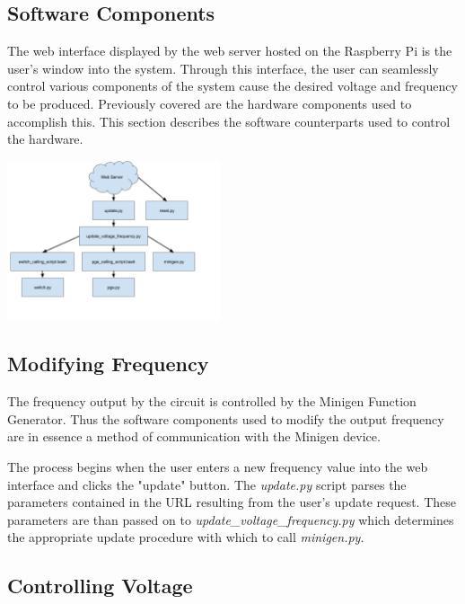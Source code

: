 \documentclass{article}	%
\begin{document}
\begin{multicols}{2}
\section{Software Components}
The web interface displayed by
the web server hosted on the Raspberry Pi
is the user's window into the system.
Through this interface,
the user can seamlessly control various
components of the system cause 
the desired voltage and frequency 
to be produced.
Previously covered are
the hardware components used to accomplish this.
This section describes the software counterparts
used to control the hardware.

\begin{center}
\includegraphics[width=0.47\textwidth,keepaspectratio]{script_layout.png}
\end{center}

\subsection{Modifying Frequency}
The frequency output by the circuit is controlled 
by the Minigen Function Generator.
Thus the software components used to 
modify the output frequency
are in essence
a method of communication with the Minigen device.

The process begins when the user 
enters a new frequency value into the web interface
and clicks the "update" button.
The \textit{update.py} script parses 
the parameters contained in the URL
resulting from the user's update request.
These parameters are than
passed on to \textit{update\_voltage\_frequency.py}
which determines the appropriate update procedure 
with which to call \textit{minigen.py}.


\subsection{Controlling Voltage}


\end{multicols}
\end{document}
